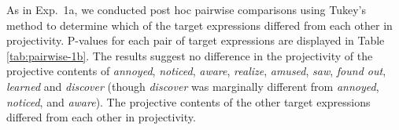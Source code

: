 \documentclass[11pt,fleqn]{article}
\newcommand{\6}{\mbox{$[\hspace*{-.6mm}[$}}
\newcommand{\9}{\mbox{$]\hspace*{-.6mm}]$}}
\newcommand{\tableref}[1]{Table \ref{#1}}
\begin{document}
As in Exp.~1a,  we conducted post hoc pairwise comparisons using Tukey's method to determine which of the target expressions differed from each other in projectivity. P-values for each pair of target expressions are displayed in \tableref{tab:pairwise-1b}. The results suggest no difference in the projectivity of the projective contents of \emph{annoyed}, \emph{noticed}, \emph{aware}, \emph{realize}, \emph{amused}, \emph{saw}, \emph{found out}, \emph{learned} and \emph{discover} (though \emph{discover} was marginally different from \emph{annoyed}, \emph{noticed}, and \emph{aware}). The projective contents of the other target expressions differed from each other in projectivity.
%
%
\end{document}
